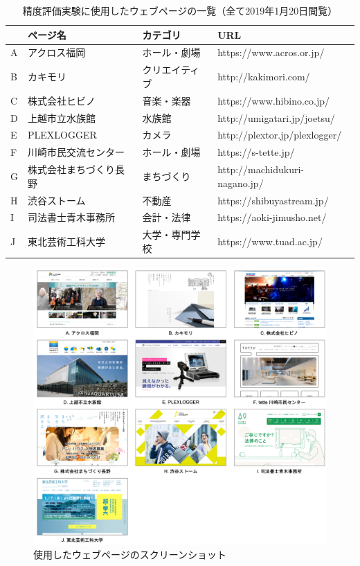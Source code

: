 \begin{table}[h]
    \caption{精度評価実験に使用したウェブページの一覧（全て2019年1月20日閲覧）}
    \label{table:webpage-list}
    \centering
    \begingroup
    \renewcommand{\arraystretch}{1.1} %
    \small
     \begin{tabular}{llll}
      \hline
      & ページ名 & カテゴリ & URL \\
      \hline \hline
      A & アクロス福岡 & ホール・劇場 & https://www.acros.or.jp/ \\
      B & カキモリ & クリエイティブ & http://kakimori.com/ \\
      C & 株式会社ヒビノ & 音楽・楽器 & https://www.hibino.co.jp/ \\
      D & 上越市立水族館 & 水族館 & http://umigatari.jp/joetsu/ \\
      E & PLEXLOGGER & カメラ & http://plextor.jp/plexlogger/ \\
      F & 川崎市民交流センター & ホール・劇場 & https://s-tette.jp/ \\
      G & 株式会社まちづくり長野 & まちづくり & http://machidukuri-nagano.jp/ \\
      H & 渋谷ストーム & 不動産 & https://shibuyastream.jp/ \\
      I & 司法書士青木事務所 & 会計・法律 & https://aoki-jimusho.net/ \\
      J & 東北芸術工科大学 & 大学・専門学校 & https://www.tuad.ac.jp/ \\
      \hline
    \end{tabular}
    \endgroup
\end{table}


\begin{figure}[H]
    \centering
    \includegraphics[width=12cm]{figures/webpage.png}
    \caption{使用したウェブページのスクリーンショット}
    \label{fig_evaluation-webpage}
\end{figure}

